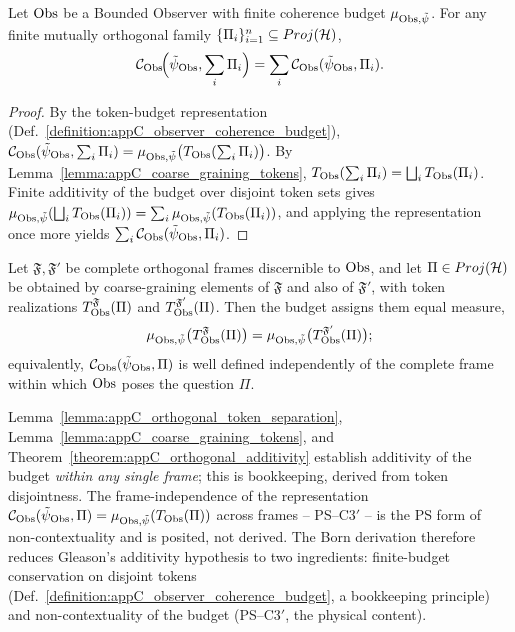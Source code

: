 \begin{theorem}
\label{theorem:appC_orthogonal_additivity}
Let $\mathrm{Obs}$ be a Bounded Observer with finite coherence budget
$\mu_{\mathrm{Obs},\tilde\psi}$. For any finite mutually orthogonal family
$\{\Pi_i\}_{i=1}^n \subseteq Proj(\mathcal{H})$,
\[
\mathcal{C}_{\mathrm{Obs}}\!\Big(\tilde\psi_{\mathrm{Obs}}, \sum_i \Pi_i\Big)
= \sum_i \mathcal{C}_{\mathrm{Obs}}(\tilde\psi_{\mathrm{Obs}}, \Pi_i).
\]
\end{theorem}

\begin{proof}
\label{proof:appC_orthogonal_additivity}
By the token-budget representation (Def.~\ref{definition:appC_observer_coherence_budget}),
$\mathcal{C}_{\mathrm{Obs}}(\tilde\psi_{\mathrm{Obs}}, \sum_i \Pi_i)
= \mu_{\mathrm{Obs},\tilde\psi}\big(T_{\mathrm{Obs}}(\sum_i \Pi_i)\big)$. By
Lemma~\ref{lemma:appC_coarse_graining_tokens},
$T_{\mathrm{Obs}}(\sum_i \Pi_i) = \bigsqcup_i T_{\mathrm{Obs}}(\Pi_i)$. Finite additivity of the budget
over disjoint token sets gives
$\mu_{\mathrm{Obs},\tilde\psi}(\bigsqcup_i T_{\mathrm{Obs}}(\Pi_i))
= \sum_i \mu_{\mathrm{Obs},\tilde\psi}(T_{\mathrm{Obs}}(\Pi_i))$, and applying the representation once
more yields $\sum_i \mathcal{C}_{\mathrm{Obs}}(\tilde\psi_{\mathrm{Obs}}, \Pi_i)$.
\end{proof}

\begin{axiom}
\label{axiom:appC_psc3prime}
Let $\mathfrak{F}, \mathfrak{F}'$ be complete orthogonal frames discernible to $\mathrm{Obs}$,
and let $\Pi \in Proj(\mathcal{H})$ be obtained by coarse-graining elements of
$\mathfrak{F}$ and also of $\mathfrak{F}'$, with token realizations
$T^{\mathfrak{F}}_{\mathrm{Obs}}(\Pi)$ and $T^{\mathfrak{F}'}_{\mathrm{Obs}}(\Pi)$. Then the budget
assigns them equal measure,
\[
\mu_{\mathrm{Obs},\tilde\psi}\big(T^{\mathfrak{F}}_{\mathrm{Obs}}(\Pi)\big)
= \mu_{\mathrm{Obs},\tilde\psi}\big(T^{\mathfrak{F}'}_{\mathrm{Obs}}(\Pi)\big);
\]
equivalently, $\mathcal{C}_{\mathrm{Obs}}(\tilde\psi_{\mathrm{Obs}},\Pi)$ is well defined independently of
the complete frame within which $\mathrm{Obs}$ poses the question $\Pi$.
\end{axiom}

\begin{remark}
\label{remark:appC_born_honest_reduction}
Lemma~\ref{lemma:appC_orthogonal_token_separation},
Lemma~\ref{lemma:appC_coarse_graining_tokens}, and
Theorem~\ref{theorem:appC_orthogonal_additivity} establish additivity of the budget
\emph{within any single frame}; this is bookkeeping, derived from token disjointness.
The frame-independence of the representation
$\mathcal{C}_{\mathrm{Obs}}(\tilde\psi_{\mathrm{Obs}},\Pi) = \mu_{\mathrm{Obs},\tilde\psi}(T_{\mathrm{Obs}}(\Pi))$ across
frames -- PS--C3$'$ -- is the PS form of non-contextuality and is posited, not derived.
The Born derivation therefore reduces Gleason's additivity hypothesis to two
ingredients: finite-budget conservation on disjoint tokens
(Def.~\ref{definition:appC_observer_coherence_budget}, a bookkeeping principle) and
non-contextuality of the budget (PS--C3$'$, the physical content).
\end{remark}

